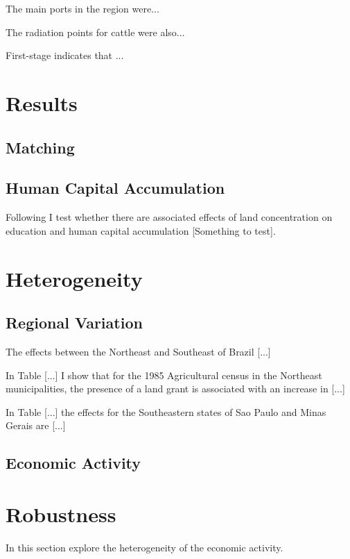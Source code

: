 \documentclass{article}
\begin{document}
The main ports in the region were... 

The radiation points for cattle were also...

First-stage indicates that ...

\section{Results}

\subsection{Matching}

\subsection{Human Capital Accumulation}

Following \parencite{Galor2009-bc} I test whether there are associated effects of land concentration on education and human capital accumulation [Something to test].

\section{Heterogeneity}

\subsection{Regional Variation}

The effects between the Northeast and Southeast of Brazil [...]

In Table [...] I show that for the 1985 Agricultural census in the Northeast municipalities, the presence of a land grant is associated with an increase in [...]

In Table [...] the effects for the Southeastern states of Sao Paulo and Minas Gerais are [...]

\parencite{Mueller1995-gi}

\subsection{Economic Activity}

\section{Robustness}

In this section explore the heterogeneity of the economic activity. 
\end{document}
